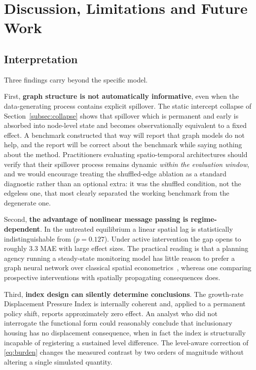 \section{Discussion, Limitations and Future Work}
\label{sec:discussion}

\subsection{Interpretation}

Three findings carry beyond the specific model.

First, \textbf{graph structure is not automatically informative}, even when the
data-generating process contains explicit spillover. The static intercept
collapse of Section~\ref{subsec:collapse} shows that spillover which is
permanent and early is absorbed into node-level state and becomes
observationally equivalent to a fixed effect. A benchmark constructed that way
will report that graph models do not help, and the report will be correct about
the benchmark while saying nothing about the method. Practitioners evaluating
spatio-temporal architectures should verify that their spillover process
remains dynamic \emph{within the evaluation window}, and we would encourage
treating the shuffled-edge ablation as a standard diagnostic rather than an
optional extra: it was the shuffled condition, not the edgeless one, that most
clearly separated the working benchmark from the degenerate one.

Second, \textbf{the advantage of nonlinear message passing is
regime-dependent}. In the untreated equilibrium a linear spatial lag is
statistically indistinguishable from \CGCEN{} ($p = 0.127$). Under active
intervention the gap opens to roughly $3.3$ MAE with large effect sizes. The
practical reading is that a planning agency running a steady-state monitoring
model has little reason to prefer a graph neural network over classical spatial
econometrics~\cite{anselin1988,lesage2009}, whereas one comparing prospective
interventions with spatially propagating consequences does.

Third, \textbf{index design can silently determine conclusions}. The
growth-rate Displacement Pressure Index is internally coherent and, applied to
a permanent policy shift, reports approximately zero effect. An analyst who did
not interrogate the functional form could reasonably conclude that inclusionary
housing has no displacement consequence, when in fact the index is structurally
incapable of registering a sustained level difference. The level-aware
correction of \eqref{eq:burden} changes the measured contrast by two orders of
magnitude without altering a single simulated quantity.

